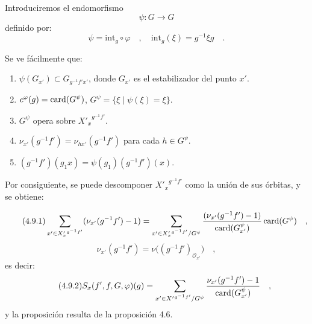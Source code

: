 \medskip

\begin{prooftext}[Demostración]
Introduciremos el endomorfismo
\[
\psi : G \longrightarrow G
\]
definido por:
\[
\psi = \mathrm{int}_g \circ \varphi \quad , \quad \mathrm{int}_g(\xi) = g^{-1}\xi g \quad .
\]

Se ve fácilmente que:
\begin{enumerate}
\item[i)] $\psi(G_{x'}) \subset G_{g^{-1}f'x'}$, donde $G_{x'}$ es el estabilizador del punto $x'$.
\item[ii)] $c^\varphi(g) = \operatorname{card}(G^\psi)$, $G^\psi = \{ \xi \mid \psi(\xi) = \xi \}$.
\item[iii)] $G^\psi$ opera sobre ${X'_x}^{g^{-1}f'}$.
\item[iv)] $\nu_{x'}(g^{-1}f') = \nu_{hx'}(g^{-1}f')$ para cada $h \in G^\psi$.
\item[v)] $(g^{-1}f')(g_1x) = \psi(g_1)(g^{-1}f')(x)$.
\end{enumerate}

Por consiguiente, se puede descomponer ${X'_x}^{g^{-1}f'}$ como la unión de sus órbitas, y se obtiene:

\begin{equation}\tag{4.9.1}
\sum_{x' \in {X'_x}^{g^{-1}f'}} (\nu_{x'}(g^{-1}f') - 1) = \sum_{x' \in {X'_x}^{g^{-1}f'}/G^\psi} \frac{(\nu_{x'}(g^{-1}f') - 1)}{\operatorname{card}(G^\psi_{x'})} \operatorname{card}(G^\psi) \quad ,
\end{equation}
\[
\nu_{x'}(g^{-1}f')=\nu\bigl((g^{-1}f')_{\mathcal{O}_{x'}}\bigr) \quad ,
\]
es decir:
\begin{equation}\tag{4.9.2}
S_x(f',f,G,\varphi)(g)=\sum_{x' \in {X'}^{g^{-1}f'}/G^\psi}
\frac{\nu_{x'}(g^{-1}f')-1}{\operatorname{card}(G^\psi_{x'})} \quad ,
\end{equation}
y la proposición resulta de la proposición 4.6.
\end{prooftext}
